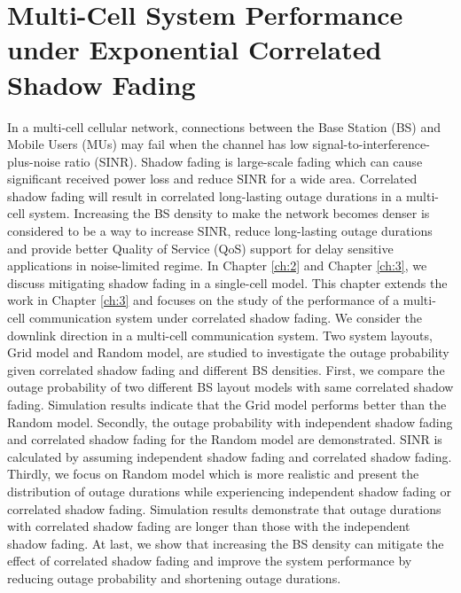 \chapter{Multi-Cell System Performance under Exponential Correlated Shadow Fading}\label{ch:4}
 \par In a multi-cell cellular network, connections between the Base Station (BS) and Mobile Users (MUs) may fail when the channel has low signal-to-interference-plus-noise ratio (SINR). Shadow fading is large-scale fading which can cause significant received power loss and reduce SINR for a wide area. Correlated shadow fading will result in correlated long-lasting outage durations in a multi-cell system. Increasing the BS density to make the network becomes denser is considered to be a way to increase SINR, reduce long-lasting outage durations and provide better Quality of Service (QoS) support for delay sensitive applications in noise-limited regime. In Chapter \ref{ch:2} and Chapter \ref{ch:3}, we discuss mitigating shadow fading in a single-cell model. This chapter extends the work in Chapter \ref{ch:3} and focuses on the study of the performance of a multi-cell communication system under correlated shadow fading. We consider the downlink direction in a multi-cell communication system. Two system layouts, Grid model and Random model, are studied to investigate the outage probability given correlated shadow fading and different BS densities. First, we compare the outage probability of two different BS layout models with same correlated shadow fading. Simulation results indicate that the Grid model performs better than the Random model. Secondly, the outage probability with independent shadow fading and correlated shadow fading for the Random model are demonstrated. SINR is calculated by assuming independent shadow fading and correlated shadow fading. Thirdly, we focus on Random model which is more realistic and present the distribution of outage durations while experiencing independent shadow fading or correlated shadow fading. Simulation results demonstrate that outage durations with correlated shadow fading are longer than those with the independent shadow fading. At last, we show that increasing the BS density can mitigate the effect of correlated shadow fading and improve the system performance by reducing outage probability and shortening outage durations. 
